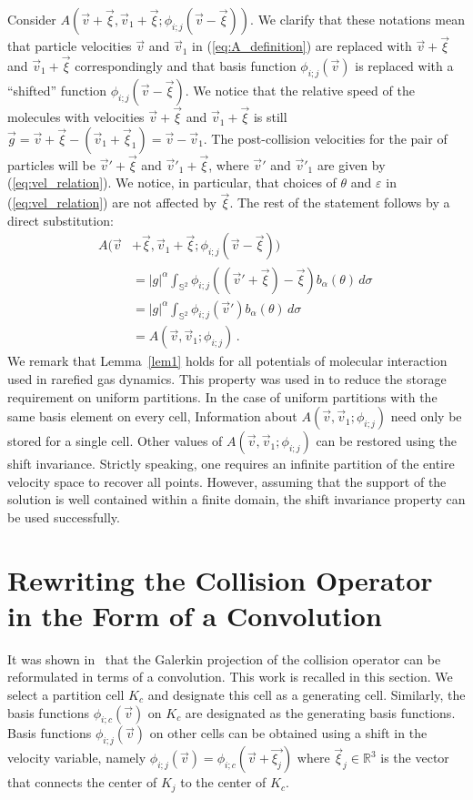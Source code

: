 \documentclass[12pt]{CSUNthesis}
\def\Sbb{\mathbb{S}}
\newcommand{\vecv}{\vec{v}}
\begin{document}
\proof
Consider $A(\vec{v}+\vec{\xi},\vec{v}_{1}+\vec{\xi};\phi_{i;j}(\vec{v}-\vec{\xi}))$. We clarify that these notations mean that
particle velocities $\vec{v}$ and $\vec{v}_{1}$ in (\ref{eq:A_definition}) are replaced with $\vec{v}+\vec{\xi}$ and $\vec{v}_{1}+\vec{\xi}$
correspondingly and that basis function $\phi_{i;j}(\vec{v})$ is replaced with a ``shifted'' function 
$\phi_{i;j}(\vec{v}-\vec{\xi})$. We notice that the relative speed of the molecules with velocities $\vec{v}+\vec{\xi}$ 
and $\vec{v}_{1}+\vec{\xi}$ is still $\vec{g}=\vec{v}+\vec{\xi}-(\vec{v}_{1}+\vec{\xi}_{1})=\vec{v}-\vec{v}_{1}$. 
The post-collision velocities for the pair of particles will be $\vec{v}'+\vec{\xi}$ and $\vec{v}'_{1}+\vec{\xi}$, where $\vec{v}'$ and $\vec{v}'_{1}$ are given by (\ref{eq:vel_relation}). We notice, in particular, that choices of $\theta$ and $\varepsilon$ in 
(\ref{eq:vel_relation}) are not affected by $\vec{\xi}$. The rest of the statement follows by a direct substitution:
\begin{align*}
A(\vec{v}&+\vec{\xi},\vec{v}_{1}+\vec{\xi};\phi_{i;j}(\vec{v}-\vec{\xi})) \\
&= |g|^{\alpha} \int_{\Sbb^2} \phi_{i;j}((\vec{v}'+\vec{\xi})-\vec{\xi}) b_{\alpha}(\theta)\, d\sigma\, \\
&= |g|^{\alpha} \int_{\Sbb^2} \phi_{i;j}(\vec{v}') b_{\alpha}(\theta)\, d\sigma \\
&= A(\vec{v},\vec{v}_{1};\phi_{i;j})\, . 
\end{align*}
\endproof
We remark that Lemma~{\ref{lem1}} holds for all potentials of molecular 
interaction used in rarefied gas dynamics. This property was used in 
\cite{AlekseenkoJosyula2012a} to reduce the storage requirement 
on uniform partitions.
In the case of uniform partitions with the same basis element on every cell, Information about $A(\vecv,\vecv_1;\phi_{i;j})$ need only be stored for a single cell.
Other values of $A(\vecv,\vecv_1;\phi_{i;j})$ can be restored using the shift invariance.
Strictly speaking, one requires an infinite partition of the entire velocity space to recover all points. However, assuming that the support of the solution is well contained within a finite domain, the shift invariance property can be used successfully. 






\section{Rewriting the Collision Operator in the Form of a Convolution}
It was shown in~\cite{AlekseenkoNguyenWood2015} that the Galerkin projection of the collision operator can be reformulated in terms of a convolution. This work is recalled in this section. 
We select a partition cell $K_c$ and designate this cell as a generating cell. 
Similarly, the basis functions $\phi_{i;c}(\vec{v})$ on $K_c$ are designated as the generating basis functions. 
Basis functions $\phi_{i;j}(\vec{v})$ on other cells can be obtained using a shift in the velocity variable, namely $\phi_{i;j} (\vec{v})=\phi_{i;c} (\vec{v}+\vec{\xi_{j}})$ where $ \vec{\xi}_{j} \in \mathbb{R}^3$ is the vector that connects the center of $K_j$ to the center of $K_c$.
\end{document}

